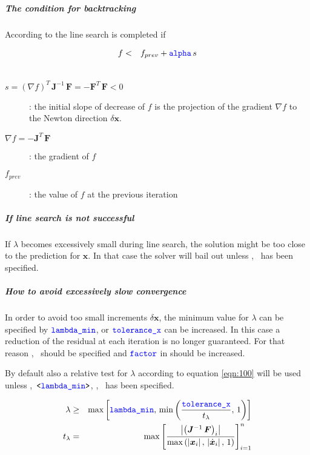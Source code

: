 \subparagraph{The condition for backtracking}
According to \cite{NUMERICAL-RECIPES-IN-C} the line search is completed if

\begin{eqnarray}
f &<& f_{prev} + \textcolor{blue}{\texttt{alpha}} \, s \\ \nonumber
\end{eqnarray}

\begin{description}
\item[$s=\left(\nabla f\right)^T\,\boldsymbol{J}^{-1}\,\boldsymbol{F} = -\boldsymbol{F}^T\,\boldsymbol{F} < 0$]:
the initial slope of decrease of $f$ is the projection of the gradient $\nabla f$ to the Newton direction $\delta\boldsymbol{x}$.
\item[$\nabla f=-\boldsymbol{J}^T\,\boldsymbol{F}$]: the gradient of $f$
\item[$f_{prev}$]: the value of $f$ at the previous iteration
\end{description}

\subparagraph{If line search is not successful}
If $\lambda$ becomes excessively small during line search, the solution might be too close to the prediction for $\boldsymbol{x}$.
In that case the solver will bail out unless ,~ has been specified.

\subparagraph{How to avoid excessively slow convergence}
In order to avoid too small increments $\delta\boldsymbol{x}$, the minimum value for $\lambda$ can be specified by $\textcolor{blue}{\texttt{lambda\_min}}$, or $\textcolor{blue}{\texttt{tolerance\_x}}$ can be increased. In this case a reduction of the residual at each iteration is no longer guaranteed. For that reason ,~ should be specified and $\textcolor{blue}{\texttt{factor}}$ in  should be increased.

By default also a relative test for $\lambda$ according to equation \ref{eqn:100} will be used unless ,~$\texttt{<\textcolor{blue}{lambda\_min}>}$, ,~ has been specified.

\begin{eqnarray}
\label{eqn:100}
\lambda &\geq& \max{\left[\textcolor{blue}{\texttt{lambda\_min}},\,\min{\left(\frac{\textcolor{blue}{\texttt{tolerance\_x}}}{t_{\lambda}},\,1\right)}\right]} \\ \nonumber
t_{\lambda}&=&\max{\left[\frac{\left|\left(\boldsymbol{J}^{-1}\,\boldsymbol{F}\right)_{i}\right|}{\max{\left(\left|\boldsymbol{x}_i\right|,\, \left|\dot{\boldsymbol{x}}_i\right|,\, 1\right)}}\right]}_{i=1}^{n}
\end{eqnarray}

